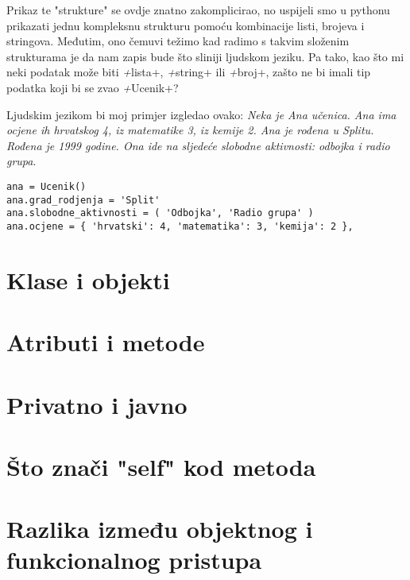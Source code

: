 Prikaz te "strukture" se ovdje znatno zakomplicirao, no uspijeli smo u pythonu
prikazati jednu kompleksnu strukturu pomoću kombinacije listi, brojeva i stringova.
Međutim, ono čemuvi težimo kad radimo s takvim složenim strukturama je da nam
zapis bude što sliniji ljudskom jeziku. Pa tako, kao što mi neki podatak može
biti \emph+lista+, \emph+string+ ili \emph+broj+, zašto ne bi imali tip podatka
koji bi se zvao \emph+Ucenik+?

Ljudskim jezikom bi moj primjer izgledao ovako: \emph{Neka je Ana učenica. Ana
ima ocjene ih hrvatskog 4, iz matematike 3, iz kemije 2. Ana je rođena u Splitu.
Rođena je 1999 godine. Ona ide na sljedeće slobodne aktivnosti: odbojka i radio
grupa}.

\begin{lstlisting}
ana = Ucenik()
ana.grad_rodjenja = 'Split'
ana.slobodne_aktivnosti = ( 'Odbojka', 'Radio grupa' )
ana.ocjene = { 'hrvatski': 4, 'matematika': 3, 'kemija': 2 },
\end{lstlisting}

\section{Klase i objekti}

\section{Atributi i metode}

\section{Privatno i javno}

\section{Što znači "self" kod metoda}

\section{Razlika između objektnog i funkcionalnog pristupa}

